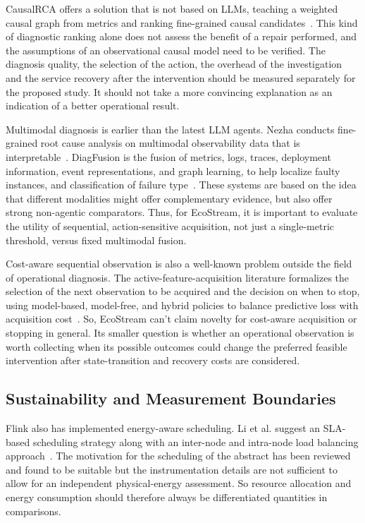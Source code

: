 CausalRCA offers a solution that is not based on LLMs, teaching a weighted causal graph from metrics and ranking fine-grained causal candidates~\cite{xin2023causalrca}. This kind of diagnostic ranking alone does not assess the benefit of a repair performed, and the assumptions of an observational causal model need to be verified. The diagnosis quality, the selection of the action, the overhead of the investigation and the service recovery after the intervention should be measured separately for the proposed study. It should not take a more convincing explanation as an indication of a better operational result.

Multimodal diagnosis is earlier than the latest LLM agents. Nezha conducts fine-grained root cause analysis on multimodal observability data that is interpretable~\cite{yu2023nezha}. DiagFusion is the fusion of metrics, logs, traces, deployment information, event representations, and graph learning, to help localize faulty instances, and classification of failure type~\cite{zhang2023diagfusion}. These systems are based on the idea that different modalities might offer complementary evidence, but also offer strong non-agentic comparators. Thus, for EcoStream, it is important to evaluate the utility of sequential, action-sensitive acquisition, not just a single-metric threshold, versus fixed multimodal fusion.

Cost-aware sequential observation is also a well-known problem outside the field of operational diagnosis. The active-feature-acquisition literature formalizes the selection of the next observation to be acquired and the decision on when to stop, using model-based, model-free, and hybrid policies to balance predictive loss with acquisition cost~\cite{aronsson2026afa}. So, EcoStream can't claim novelty for cost-aware acquisition or stopping in general. Its smaller question is whether an operational observation is worth collecting when its possible outcomes could change the preferred feasible intervention after state-transition and recovery costs are considered.

\subsection{Sustainability and Measurement Boundaries}
Flink also has implemented energy-aware scheduling. Li et al. suggest an SLA-based scheduling strategy along with an inter-node and intra-node load balancing approach~\cite{li2025energyflink}. The motivation for the scheduling of the abstract has been reviewed and found to be suitable but the instrumentation details are not sufficient to allow for an independent physical-energy assessment. So resource allocation and energy consumption should therefore always be differentiated quantities in comparisons.

